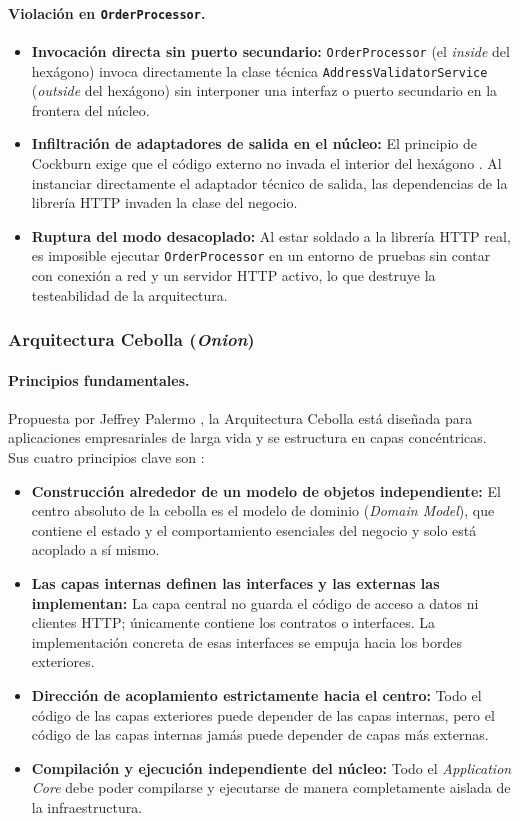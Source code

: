 \paragraph{Violación en \texttt{OrderProcessor}.}
\begin{itemize}
    \item \textbf{Invocación directa sin puerto secundario:} \texttt{OrderProcessor} (el \emph{inside} del hexágono) invoca directamente la clase técnica \texttt{AddressValidatorService} (\emph{outside} del hexágono) sin interponer una interfaz o puerto secundario en la frontera del núcleo.
    \item \textbf{Infiltración de adaptadores de salida en el núcleo:} El principio de Cockburn exige que el código externo no invada el interior del hexágono \parencite{cockburn2005}. Al instanciar directamente el adaptador técnico de salida, las dependencias de la librería HTTP invaden la clase del negocio.
    \item \textbf{Ruptura del modo desacoplado:} Al estar soldado a la librería HTTP real, es imposible ejecutar \texttt{OrderProcessor} en un entorno de pruebas sin contar con conexión a red y un servidor HTTP activo, lo que destruye la testeabilidad de la arquitectura.
\end{itemize}

\subsubsection*{Arquitectura Cebolla (\emph{Onion})}

\paragraph{Principios fundamentales.} Propuesta por Jeffrey Palermo \parencite{palermo2008}, la Arquitectura Cebolla está diseñada para aplicaciones empresariales de larga vida y se estructura en capas concéntricas. Sus cuatro principios clave son \parencite{palermo2008}:

\begin{itemize}
    \item \textbf{Construcción alrededor de un modelo de objetos independiente:} El centro absoluto de la cebolla es el modelo de dominio (\emph{Domain Model}), que contiene el estado y el comportamiento esenciales del negocio y solo está acoplado a sí mismo.
    \item \textbf{Las capas internas definen las interfaces y las externas las implementan:} La capa central no guarda el código de acceso a datos ni clientes HTTP; únicamente contiene los contratos o interfaces. La implementación concreta de esas interfaces se empuja hacia los bordes exteriores.
    \item \textbf{Dirección de acoplamiento estrictamente hacia el centro:} Todo el código de las capas exteriores puede depender de las capas internas, pero el código de las capas internas jamás puede depender de capas más externas.
    \item \textbf{Compilación y ejecución independiente del núcleo:} Todo el \emph{Application Core} debe poder compilarse y ejecutarse de manera completamente aislada de la infraestructura.
\end{itemize}

